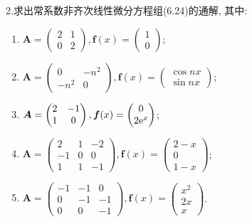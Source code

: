 2.求出常系数非齐次线性微分方程组(6.24)的通解, 其中:
\begin{enumerate}[(1)]
\item $\bm{A}=\begin{pmatrix}2&1\\0&2\end{pmatrix},\bm{f}(x)=\begin{pmatrix}1\\0\end{pmatrix}$;
\item $\bm{A}=\begin{pmatrix}0&-n^2\\-n^2&0\end{pmatrix},\bm{f}(x)=\begin{pmatrix}\cos nx\\\sin nx\end{pmatrix}$;
\item $\bm{A}=\begin{pmatrix}2&-1\\1&0\end{pmatrix},\bm{f}(x)=\begin{pmatrix}0\\2\mathrm{e}^x\end{pmatrix}$;
\item $\bm{A}=\begin{pmatrix}2&1&-2\\-1&0&0\\1&1&-1\end{pmatrix},\bm{f}(x)=\begin{pmatrix}2-x\\0\\1-x\end{pmatrix}$;
\item $\bm{A}=\begin{pmatrix}-1&-1&0\\0&-1&-1\\0&0&-1\end{pmatrix},\bm{f}(x)=\begin{pmatrix}x^2\\2x\\x\end{pmatrix}$.
\end{enumerate}

